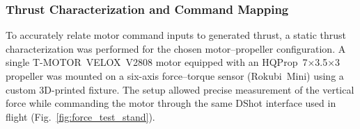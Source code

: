 \subsubsection{Thrust Characterization and Command Mapping}
To accurately relate motor command inputs to generated thrust, a static thrust characterization was performed for the chosen motor–propeller configuration.  
A single T-MOTOR~VELOX~V2808 motor equipped with an HQProp~7×3.5×3 propeller was mounted on a six-axis force–torque sensor (Rokubi~Mini) using a custom 3D-printed fixture.  
The setup allowed precise measurement of the vertical force while commanding the motor through the same DShot interface used in flight (Fig.~\ref{fig:force_test_stand}).

\begin{figure}[h]
\centering
{}
\end{figure}
